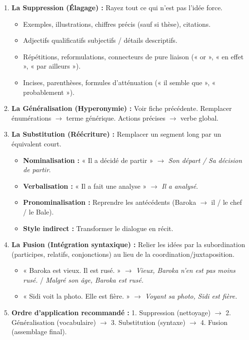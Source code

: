 \documentclass[11pt]{article}
\begin{document}
\begin{methode}
    \begin{enumerate}
        \item \textbf{La Suppression (Élagage) :} Rayez tout ce qui n'est pas l'idée force.
            \begin{itemize}
                \item Exemples, illustrations, chiffres précis (sauf si thèse), citations.
                \item Adjectifs qualificatifs subjectifs / détails descriptifs.
                \item Répétitions, reformulations, connecteurs de pure liaison (« or », « en effet », « par ailleurs »).
                \item Incises, parenthèses, formules d'atténuation (« il semble que », « probablement »).
            \end{itemize}
        \item \textbf{La Généralisation (Hyperonymie) :} Voir fiche précédente. Remplacer énumérations $\rightarrow$ terme générique. Actions précises $\rightarrow$ verbe global.
        \item \textbf{La Substitution (Réécriture) :} Remplacer un segment long par un équivalent court.
            \begin{itemize}
                \item \textbf{Nominalisation :} « Il a décidé de partir » $\rightarrow$ \emph{Son départ / Sa décision de partir}.
                \item \textbf{Verbalisation :} « Il a fait une analyse » $\rightarrow$ \emph{Il a analysé}.
                \item \textbf{Pronominalisation :} Reprendre les antécédents (Baroka $\rightarrow$ il / le chef / le Bale).
                \item \textbf{Style indirect :} Transformer le dialogue en récit.
            \end{itemize}
        \item \textbf{La Fusion (Intégration syntaxique) :} Relier les idées par la subordination (participes, relatifs, conjonctions) au lieu de la coordination/juxtaposition.
            \begin{itemize}
                \item « Baroka est vieux. Il est rusé. » $\rightarrow$ \emph{Vieux, Baroka n'en est pas moins rusé.} / \emph{Malgré son âge, Baroka est rusé.}
                \item « Sidi voit la photo. Elle est fière. » $\rightarrow$ \emph{Voyant sa photo, Sidi est fière.}
            \end{itemize}
        \item \textbf{Ordre d'application recommandé :} 1. Suppression (nettoyage) $\rightarrow$ 2. Généralisation (vocabulaire) $\rightarrow$ 3. Substitution (syntaxe) $\rightarrow$ 4. Fusion (assemblage final).
    \end{enumerate}
\end{methode}
\end{document}
